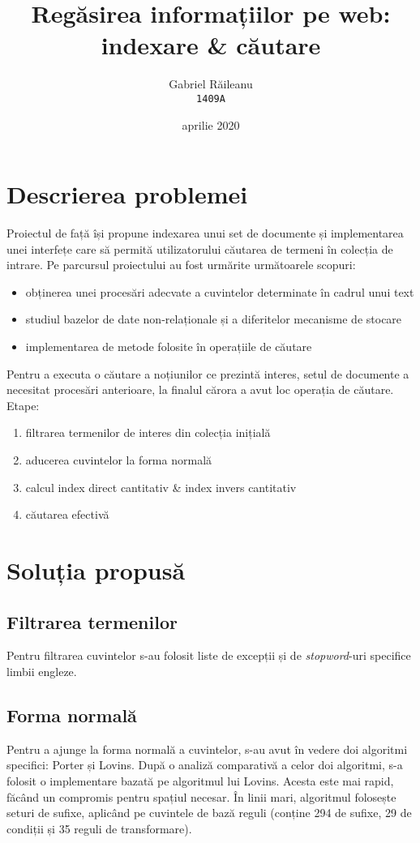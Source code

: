 \documentclass[12pt]{article}
\title{Regăsirea informațiilor pe web: indexare \& căutare} %
\author{Gabriel Răileanu\\ \texttt{1409A}} %
\date{aprilie 2020} %
\begin{document}
\maketitle %


\section{Descrierea problemei}
Proiectul de față își propune indexarea unui set de documente și implementarea unei interfețe care să permită utilizatorului căutarea de termeni în colecția de intrare.
Pe parcursul proiectului au fost urmărite următoarele scopuri:
\begin{itemize}
	\item obținerea unei procesări adecvate a cuvintelor determinate în cadrul unui text
	\item studiul bazelor de date non-relaționale și a diferitelor mecanisme de stocare
	\item implementarea de metode  folosite în operațiile de căutare
\end{itemize}
Pentru a executa o căutare a noțiunilor ce prezintă interes, setul de documente a necesitat procesări anterioare, la finalul cărora a avut loc operația de căutare. Etape:
\begin{enumerate}
	\item filtrarea termenilor de interes din colecția inițială
	\item aducerea cuvintelor la forma normală
	\item calcul index direct cantitativ \& index invers cantitativ
	\item căutarea efectivă
\end{enumerate}
\section{Soluția propusă}
\subsection{Filtrarea termenilor}
Pentru filtrarea cuvintelor s-au folosit liste de excepții și de \textit{stopword}-uri specifice limbii engleze.
\subsection{Forma normală}
Pentru a ajunge la forma normală a cuvintelor, s-au avut în vedere doi algoritmi specifici: Porter și Lovins. După o analiză comparativă a celor doi algoritmi, s-a folosit o implementare bazată pe algoritmul lui Lovins. Acesta este mai rapid, făcând un compromis pentru spațiul necesar. În linii mari, algoritmul folosește seturi de sufixe, aplicând pe cuvintele de bază reguli (conține 294 de sufixe, 29 de condiții și 35 reguli de transformare).
\end{document}
